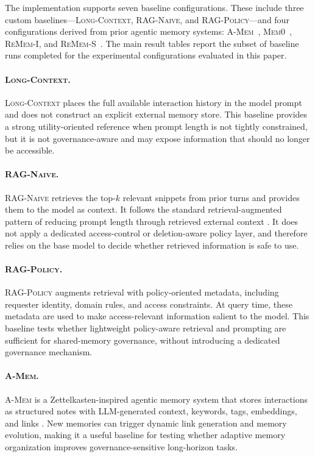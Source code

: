 The implementation supports seven baseline configurations. These include three custom baselines---\textsc{Long-Context}, \textsc{RAG-Naive}, and \textsc{RAG-Policy}---and four configurations derived from prior agentic memory systems: \textsc{A-Mem}~\citep{xu2026mem}, \textsc{Mem0}~\citep{chhikara2025mem0}, \textsc{ReMem-I}, and \textsc{ReMem-S}~\citep{shu2026remem}. The main result tables report the subset of baseline runs completed for the experimental configurations evaluated in this paper.

\paragraph{\textsc{Long-Context}.}
\textsc{Long-Context} places the full available interaction history in the model prompt and does not construct an explicit external memory store. This baseline provides a strong utility-oriented reference when prompt length is not tightly constrained, but it is not governance-aware and may expose information that should no longer be accessible.

\paragraph{\textsc{RAG-Naive}.}
\textsc{RAG-Naive} retrieves the top-$k$ relevant snippets from prior turns and provides them to the model as context. It follows the standard retrieval-augmented pattern of reducing prompt length through retrieved external context \citep{lewis2020retrieval}. It does not apply a dedicated access-control or deletion-aware policy layer, and therefore relies on the base model to decide whether retrieved information is safe to use.

\paragraph{\textsc{RAG-Policy}.}
\textsc{RAG-Policy} augments retrieval with policy-oriented metadata, including requester identity, domain rules, and access constraints. At query time, these metadata are used to make access-relevant information salient to the model. This baseline tests whether lightweight policy-aware retrieval and prompting are sufficient for shared-memory governance, without introducing a dedicated governance mechanism.

\paragraph{\textsc{A-Mem}.}
\textsc{A-Mem} is a Zettelkasten-inspired agentic memory system that stores interactions as structured notes with LLM-generated context, keywords, tags, embeddings, and links \citep{xu2026mem}. New memories can trigger dynamic link generation and memory evolution, making it a useful baseline for testing whether adaptive memory organization improves governance-sensitive long-horizon tasks.


